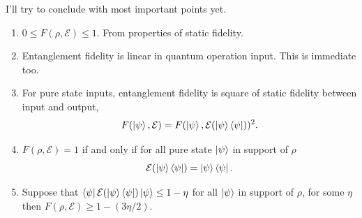 I'll try to conclude with most important points yet.
\begin{enumerate}
    \item $0\leq F(\rho, \mathcal{E}) \leq 1$. From properties of static fidelity.
    \item Entanglement fidelity is linear in quantum operation input. This is immediate too.
    \item For pure state inputs, entanglement fidelity is square of static fidelity between input and output,
    \begin{equation}
        F(\ket{\psi}, \mathcal{E}) = F(\ket{\psi}, \operatorname{\mathcal{E}}(\ket{\psi}\bra{\psi}))^2.
    \end{equation}
    \item $F(\rho, \mathcal{E})=1$ if and only if for all pure state $\ket{\psi}$ in support of $\rho$
    \begin{equation}
        \operatorname{\mathcal{E}}(\ket{\psi}\bra{\psi}) = \ket{\psi}\bra{\psi}.
    \end{equation}
    \item Suppose that $\bra{\psi}\operatorname{\mathcal{E}}(\ket{\psi}\bra{\psi})\ket{\psi} \leq 1-\eta$ for all $\ket{\psi}$ in support of $\rho$, for some $\eta$ then $F(\rho, \mathcal{E}) \geq 1-(3\eta/2)$.
\end{enumerate}